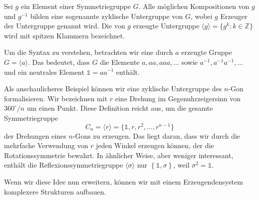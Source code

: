 \begin{definition}
%
%
  Sei \(g\) ein Element einer Symmetriegruppe \(G\).
  Alle möglichen Kompositionen von \(g\) und \(g^{-1}\) bilden eine sogenannte zyklische Untergruppe von \(G\), wobei \(g\) Erzeuger der Untergruppe genannt wird.
  Die von \(g\) erzeugte Untergruppe \(\langle g \rangle = \{ g^k : k \in \mathbb{Z} \}\) wird mit spitzen Klammern bezeichnet.
%
\end{definition}
\begin{beispiel}
  Um die Syntax zu verstehen, betrachten wir eine durch \(a\) erzeugte Gruppe \(G = \langle a \rangle\).
  Das bedeutet, dass \(G\) die Elemente \(a, aa, aaa, \ldots\) sowie \(a^{-1}, a^{-1}a^{-1}, \ldots\) und ein neutrales Element \(\mathds{1} = aa^{-1}\) enthält.
\end{beispiel}
\begin{beispiel}
  Als anschaulicheres Beispiel können wir eine zyklische Untergruppe des \(n\)-Gon formalisieren.
%
  Wir bezeichnen mit \(r\) eine Drehung im Gegenuhrzeigersinn von \(360^\circ/n\) um einen Punkt.
  Diese Definition reicht aus, um die gesamte Symmetriegruppe
  \[
    C_n = \langle r \rangle
      = \{\mathds{1}, r, r^2, \ldots, r^{n-1}\}
  \]
%
  der Drehungen eines \(n\)-Gons zu erzeugen.
  Das liegt daran, dass wir durch die mehrfache Verwendung von \(r\) jeden Winkel erzeugen k\"onnen, der die Rotationssymmetrie bewahrt.
  In ähnlicher Weise, aber weniger interessant, enthält die Reflexionssymmetriegruppe \(\langle\sigma\rangle\) nur \(\left\{\mathds{1}, \sigma\right\}\), weil \(\sigma^2 = \mathds{1}\).
\end{beispiel}

Wenn wir diese Idee nun erweitern, können wir mit einem Erzeugendensystem
komplexere Strukturen aufbauen.

